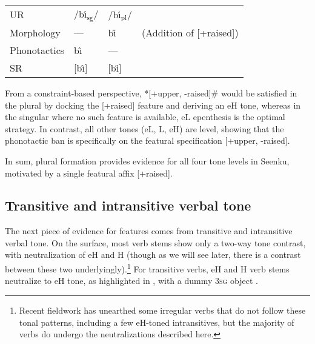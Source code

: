\documentclass[output=paper]{langsci/langscibook}
\begin{document}
\ea\label{ex:mcpherson:10} \begin{tabular}[t]{llll}
UR & /b\'{\i}$_{\text{sg}}$/ & /b\'{\i}$_{\text{pl}}$/ & \\
Morphology & --- & b\H{\i} & (Addition of [+raised]) \\
Phonotactics & b\^{\i} & --- & \\
SR & [b\^{\i}] & [b\H{\i}] \\
\end{tabular}
\z 

From a constraint-based perspective, *[+upper, -raised]\# would be satisfied in the plural by docking the [+raised] feature and deriving an eH tone, whereas in the singular where no such feature is available, eL epenthesis is the optimal strategy. In contrast, all other tones (eL, L, eH) are level, showing that the phonotactic ban is specifically on the featural specification [+upper, -raised]. 

In sum, plural formation provides evidence for all four tone levels in Seenku, motivated by a single featural affix [+raised].

\subsection{Transitive and intransitive verbal tone}\label{sec:mcpherson:SecTransitive}

The next piece of evidence for features comes from transitive and intransitive verbal tone. On the surface, most verb stems show only a two-way tone contrast, with neutralization of eH and H (though as we will see later, there is a contrast between these two underlyingly).\footnote{Recent fieldwork has unearthed some irregular verbs that do not follow these tonal patterns, including a few eH-toned intransitives, but the majority of verbs do undergo the neutralizations described here.} For transitive verbs, eH and H verb stems neutralize to eH tone, as highlighted in , with a dummy 3\textsc{sg} object {\it {}}.
\end{document}
